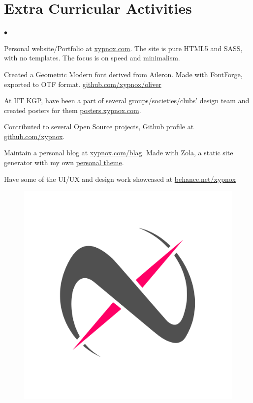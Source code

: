 \documentclass[a4paper,12pt]{extarticle} %
\begin{document}
\section{\textcolor{primary}{Extra Curricular Activities}}
\begin{list} {$\bullet$} {}
  \item {Personal website/Portfolio at \href {https://www.xypnox.com}{xypnox.com}. The site is pure HTML5 and SASS, with no templates. The focus is on speed and minimalism.}
  \item {Created a Geometric Modern font derived from Aileron. Made with FontForge, exported to OTF format. \href {https://github.com/xypnox/oliver}{github.com/xypnox/oliver} }
  \item {At IIT KGP, have been a part of several groups/societies/clubs' design team and created posters for them \href{https://posters.xypnox.com}{posters.xypnox.com}.}
  \item {Contributed to several Open Source projects, Github profile at \href {https://github.com/xypnox}{github.com/xypnox}.}
  \item { Maintain a personal blog at \href {https://www.xypnox.com/blag}{xypnox.com/blag}. Made with Zola, a static site generator with my own \href{https://github.com/xypnox/xyblag-theme}{personal theme}.}
  \item {Have some of the UI/UX and design work showcased at \href {https://www.behance.net/xypnox}{behance.net/xypnox}}
\end{list}

\vspace{2cm}

\begin{figure}[h]
  \centering
  \includegraphics[scale=0.33]{images/footer.png}
\end{figure}

\end{document}
